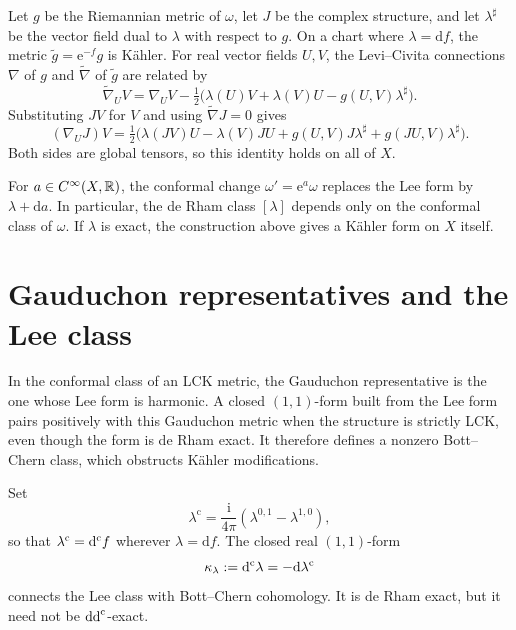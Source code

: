 Let $g$ be the Riemannian metric of $\omega$, let $J$ be the complex structure, and let $\lambda^\sharp$ be the vector field dual to $\lambda$ with respect to $g$. On a chart where $\lambda=\mathrm df$, the metric $\widetilde g=\mathrm{e}^{-f}g$ is K\"ahler. For real vector fields $U,V$, the Levi--Civita connections $\nabla$ of $g$ and $\widetilde\nabla$ of $\widetilde g$ are related by
\[
 \widetilde\nabla_UV=\nabla_UV-\tfrac12\bigl(\lambda(U)V+\lambda(V)U-g(U,V)\lambda^\sharp\bigr).
\]
Substituting $JV$ for $V$ and using $\widetilde\nabla J=0$ gives
\begin{equation}\label{eq:lck-complex-connection}
 (\nabla_UJ)V=\tfrac12\bigl(\lambda(JV)U-\lambda(V)JU+g(U,V)J\lambda^\sharp+g(JU,V)\lambda^\sharp\bigr).
\end{equation}
Both sides are global tensors, so this identity holds on all of $X$.

For $a\in C^\infty(X,\mathbb R)$, the conformal change $\omega'=\mathrm{e}^a\omega$ replaces the Lee form by $\lambda+\mathrm{d}a$. In particular, the de Rham class $[\lambda]$ depends only on the conformal class of $\omega$. If $\lambda$ is exact, the construction above gives a K\"ahler form on $X$ itself.

\section{Gauduchon representatives and the Lee class}
\label{sec:lck-lee-class}

In the conformal class of an LCK metric, the Gauduchon representative is the one whose Lee form is harmonic. A closed $(1,1)$-form built from the Lee form pairs positively with this Gauduchon metric when the structure is strictly LCK, even though the form is de Rham exact. It therefore defines a nonzero Bott--Chern class, which obstructs K\"ahler modifications.

Set
\[
 \lambda^{\mathrm c}
 =\frac{\mathrm i}{4\pi}(\lambda^{0,1}-\lambda^{1,0}),
\]
so that $\lambda^{\mathrm c}=\mathrm d^{\mathrm c} f$ wherever $\lambda=\mathrm{d}f$. The closed real $(1,1)$-form
\begin{equation}\label{eq:lck-lee-curvature}
 \kappa_\lambda:=\mathrm d^{\mathrm c}\lambda=-\mathrm{d}\lambda^{\mathrm c}
\end{equation}
connects the Lee class with Bott--Chern cohomology. It is de Rham exact, but it need not be $\mathrm{dd}^{\mathrm{c}}$-exact.

